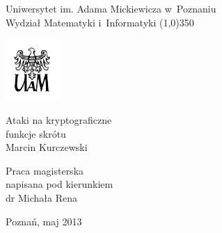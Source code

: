 \documentclass[12pt,a4paper,twoside]{article}
\begin{document}
\onehalfspacing
\newcommand{\myparagraph}[1]{\paragraph{#1}\mbox{}\\}
\newcommand{\latin}[1]{\foreignlanguage{latin}{\textit{#1}}}
\newcommand{\en}[1]{\textit{\enn{#1}}}
\newcommand{\enn}[1]{\foreignlanguage{english}{#1}}
\newcommand{\abbr}[1]{\textit{#1}}
\newenvironment{myenumerate}
    {\begin{enumerate}[label*=\arabic*.]}
    {\end{enumerate}}
\DeclarePairedDelimiter{\ceil}{\lceil}{\rceil}
\DeclarePairedDelimiter{\floor}{\lfloor}{\rfloor}

\lstset{showstringspaces=false}
\lstset{keepspaces=true}
\lstset{tabsize=2}
\lstset{stepnumber=1}
\lstset{numbers=left}
\lstset{numbersep=5pt}
\lstset{breaklines=true}
\lstset{basicstyle=\ttfamily\small}
\lstset{upquote=true}

\begin{titlepage}
    \begin{center}
    {\LARGE Uniwersytet im. Adama Mickiewicza w~Poznaniu \\
    Wydział Matematyki i~Informatyki}
    \line(1,0){350}

    \vspace{1cm}
    \includegraphics[width=2cm]{logo-uam/logo-uam.png}
    \vspace{1cm}

    \vspace{1cm}
    {\Huge Ataki na kryptograficzne \\ funkcje skrótu} \\[0.5cm]
    {\Large Marcin Kurczewski}
    \end{center}

    \vspace{3cm}
    \hspace{8cm}\parbox[l]{6cm}{\Large Praca magisterska \\
    napisana pod kierunkiem \\
    dr Michała Rena}

    \begin{center}
    \vspace{4cm}
    Poznań, maj 2013
    \end{center}
\end{titlepage}
\end{document}
